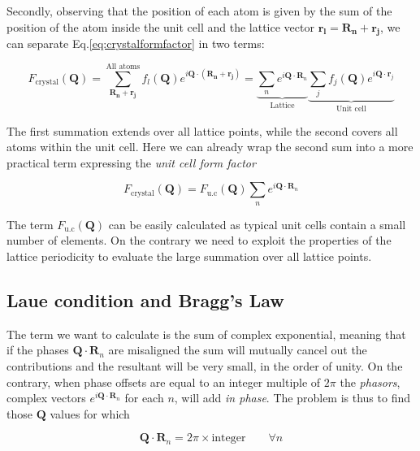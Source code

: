 Secondly, observing that the position of each atom is given by the sum of the position of the atom inside the unit cell 
and the lattice vector $\mathbf{r_l} = \mathbf{R_n} + \mathbf{r_j}$, we can separate Eq.\ref{eq:crystalformfactor} in two terms: 

\begin{equation}
    F_{\text{crystal}}(\mathbf{Q}) = 
   \sum_{\mathbf{R_n} + \mathbf{r_j}}^{\text{All atoms}} f_l(\mathbf Q) e^{i \mathbf{Q} \cdot (\mathbf{R_n} + \mathbf{r_j})} = 
    \underbrace{\sum_{n} e^{i \mathbf{Q} \cdot \mathbf{R}_n}}_{\text{Lattice}}
    \underbrace{\sum_{j} f_j(\mathbf{Q}) e^{i \mathbf{Q} \cdot \mathbf{r}_j}}_{\text{Unit cell}}
   \label{eq:crystalformfactor2}
\end{equation} 

The first summation extends over all lattice points, while the second covers all atoms within the unit cell. 
Here we can already wrap the second sum into a more practical term expressing the \textit{unit cell form factor} 

\begin{equation}
    F_{\text{crystal}}(\mathbf{Q}) =  F_{\text{u.c}}(\mathbf{Q}) \sum_{n} e^{i \mathbf{Q} \cdot \mathbf{R}_n}
   \label{eq:crystalformfactor3}
\end{equation}

The term $ F_{\text{u.c}}(\mathbf{Q}) $ can be easily calculated as typical unit cells contain a small number of elements.
On the contrary we need to exploit the properties of the lattice periodicity to evaluate the large summation over all lattice 
points. 


\subsection{Laue condition and Bragg's Law} 

The term we want to calculate is the sum of complex exponential, meaning that if the phases $\mathbf{Q} \cdot \mathbf{R}_n$ 
are misaligned the sum will mutually cancel out the contributions and the resultant will be very small, in the order of unity. 
On the contrary, when phase offsets are equal to an integer multiple of $2\pi$ the \textit{phasors}, complex vectors 
$e^{i \mathbf{Q} \cdot \mathbf{R}_n}$ for each $n$, will add \textit{in phase}. 
The problem is thus to find those $\mathbf{Q}$ values for which

\begin{equation}
   \mathbf{Q} \cdot \mathbf{R}_n = 2\pi \times \text{integer}  \qquad \forall n
   \label{eq:laue}
\end{equation}

